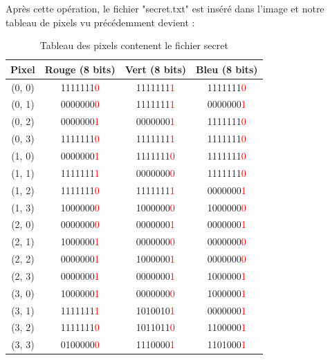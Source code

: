 \documentclass{article}
\begin{document}
Après cette opération, le fichier "secret.txt" est inséré dans l'image et notre tableau de pixels vu précédemment devient :

\newpage

\begin{table}[h]
  \centering
  \begin{tabular}{|c|c|c|c|}
    \hline
    \textbf{Pixel} & \textbf{Rouge (8 bits)} & \textbf{Vert (8 bits)} & \textbf{Bleu (8 bits)} \\
    \hline
    (0, 0) & 1111111\textcolor{red}{0} & 1111111\textcolor{red}{1} & 1111111\textcolor{red}{0} \\
    (0, 1) & 0000000\textcolor{red}{0} & 1111111\textcolor{red}{1} & 0000000\textcolor{red}{1} \\
    (0, 2) & 0000000\textcolor{red}{1} & 0000000\textcolor{red}{1} & 1111111\textcolor{red}{0} \\
    (0, 3) & 1111111\textcolor{red}{0} & 1111111\textcolor{red}{1} & 1111111\textcolor{red}{0} \\
    \hline
    (1, 0) & 0000000\textcolor{red}{1} & 1111111\textcolor{red}{0} & 1111111\textcolor{red}{0} \\
    (1, 1) & 1111111\textcolor{red}{1} & 0000000\textcolor{red}{0} & 1111111\textcolor{red}{0} \\
    (1, 2) & 1111111\textcolor{red}{0} & 1111111\textcolor{red}{1} & 0000000\textcolor{red}{1} \\
    (1, 3) & 1000000\textcolor{red}{0} & 1000000\textcolor{red}{0} & 1000000\textcolor{red}{0} \\
    \hline
    (2, 0) & 0000000\textcolor{red}{0} & 0000000\textcolor{red}{1} & 0000000\textcolor{red}{1} \\
    (2, 1) & 1000000\textcolor{red}{1} & 0000000\textcolor{red}{0} & 0000000\textcolor{red}{0} \\
    (2, 2) & 0000000\textcolor{red}{1} & 1000000\textcolor{red}{1} & 0000000\textcolor{red}{0} \\
    (2, 3) & 0000000\textcolor{red}{1} & 0000000\textcolor{red}{1} & 1000000\textcolor{red}{1} \\
    \hline
    (3, 0) & 1000000\textcolor{red}{1} & 0000000\textcolor{red}{0} & 1000000\textcolor{red}{1} \\
    (3, 1) & 1111111\textcolor{red}{1} & 1010010\textcolor{red}{1} & 0000000\textcolor{red}{1} \\
    (3, 2) & 1111111\textcolor{red}{0} & 1011011\textcolor{red}{0} & 1100000\textcolor{red}{1} \\
    (3, 3) & 0100000\textcolor{red}{0} & 1110000\textcolor{red}{1} & 1101000\textcolor{red}{1} \\
    \hline
  \end{tabular}
  \caption{Tableau des pixels contenent le fichier secret}
  \label{}
\end{table}
\end{document}
